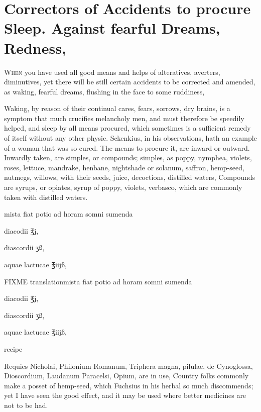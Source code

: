 \section[Correctors for sleep]{Correctors of Accidents to procure Sleep. Against fearful Dreams, Redness, \etc{}}

\lettrine{W}{hen} you have used all good means and helps of alteratives, averters,
diminutives, yet there will be still certain accidents to be corrected
and amended, as waking, fearful dreams, flushing in the face to some
ruddiness, \etc{}

Waking, by reason of their continual cares, fears, sorrows, dry brains,
is a symptom that much crucifies melancholy men, and must therefore be
speedily helped, and sleep by all means procured, which sometimes is a
sufficient remedy of itself without any other physic. Sckenkius,
in his observations, hath an example of a woman that was so cured. The
means to procure it, are inward or outward. Inwardly taken, are
simples, or compounds; simples, as poppy, nymphea, violets, roses,
lettuce, mandrake, henbane, nightshade or solanum, saffron, hemp-seed,
nutmegs, willows, with their seeds, juice, decoctions, distilled
waters, \etc{} Compounds are syrups, or opiates, syrup of poppy, violets,
verbasco, which are commonly taken with distilled waters.

\begin{Prescription}[H]
\begin{prescriptionbox}{}{\textlatin{mista fiat potio ad horam somni sumenda}}
\item \textlatin{diacodii ℥j},
\item \textlatin{diascordii ʒß},
\item \textlatin{aquae lactucae ℥iijß},
\end{prescriptionbox}
\begin{prescriptionbox}{FIXME translation}{\textlatin{mista fiat potio ad horam somni sumenda}}
\item \textlatin{diacodii ℥j},
\item \textlatin{diascordii ʒß},
\item \textlatin{aquae lactucae ℥iijß},
\end{prescriptionbox}
\caption{ recipe}
\end{Prescription}

Requies Nicholai, Philonium Romanum, Triphera magna, pilulae, de
Cynoglossa, Dioscordium, Laudanum Paracelsi, Opium, are in use, \etc{}
Country folks commonly make a posset of hemp-seed, which Fuchsius in
his herbal so much discommends; yet I have seen the good effect, and it
may be used where better medicines are not to be had.

